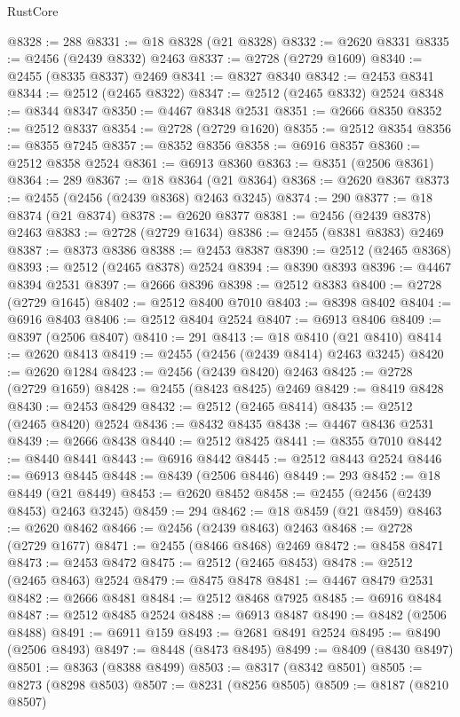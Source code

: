 \begin{lexlean}{RustCore}
\begin{coremodule}
@8328 := 288
@8331 := @18 @8328 (@21 @8328)
@8332 := @2620 @8331
@8335 := @2456 (@2439 @8332) @2463
@8337 := @2728 (@2729 @1609)
@8340 := @2455 (@8335 @8337) @2469
@8341 := @8327 @8340
@8342 := @2453 @8341
@8344 := @2512 (@2465 @8322)
@8347 := @2512 (@2465 @8332) @2524
@8348 := @8344 @8347
@8350 := @4467 @8348 @2531
@8351 := @2666 @8350
@8352 := @2512 @8337
@8354 := @2728 (@2729 @1620)
@8355 := @2512 @8354
@8356 := @8355 @7245
@8357 := @8352 @8356
@8358 := @6916 @8357
@8360 := @2512 @8358 @2524
@8361 := @6913 @8360
@8363 := @8351 (@2506 @8361)
@8364 := 289
@8367 := @18 @8364 (@21 @8364)
@8368 := @2620 @8367
@8373 := @2455 (@2456 (@2439 @8368) @2463 @3245)
@8374 := 290
@8377 := @18 @8374 (@21 @8374)
@8378 := @2620 @8377
@8381 := @2456 (@2439 @8378) @2463
@8383 := @2728 (@2729 @1634)
@8386 := @2455 (@8381 @8383) @2469
@8387 := @8373 @8386
@8388 := @2453 @8387
@8390 := @2512 (@2465 @8368)
@8393 := @2512 (@2465 @8378) @2524
@8394 := @8390 @8393
@8396 := @4467 @8394 @2531
@8397 := @2666 @8396
@8398 := @2512 @8383
@8400 := @2728 (@2729 @1645)
@8402 := @2512 @8400 @7010
@8403 := @8398 @8402
@8404 := @6916 @8403
@8406 := @2512 @8404 @2524
@8407 := @6913 @8406
@8409 := @8397 (@2506 @8407)
@8410 := 291
@8413 := @18 @8410 (@21 @8410)
@8414 := @2620 @8413
@8419 := @2455 (@2456 (@2439 @8414) @2463 @3245)
@8420 := @2620 @1284
@8423 := @2456 (@2439 @8420) @2463
@8425 := @2728 (@2729 @1659)
@8428 := @2455 (@8423 @8425) @2469
@8429 := @8419 @8428
@8430 := @2453 @8429
@8432 := @2512 (@2465 @8414)
@8435 := @2512 (@2465 @8420) @2524
@8436 := @8432 @8435
@8438 := @4467 @8436 @2531
@8439 := @2666 @8438
@8440 := @2512 @8425
@8441 := @8355 @7010
@8442 := @8440 @8441
@8443 := @6916 @8442
@8445 := @2512 @8443 @2524
@8446 := @6913 @8445
@8448 := @8439 (@2506 @8446)
@8449 := 293
@8452 := @18 @8449 (@21 @8449)
@8453 := @2620 @8452
@8458 := @2455 (@2456 (@2439 @8453) @2463 @3245)
@8459 := 294
@8462 := @18 @8459 (@21 @8459)
@8463 := @2620 @8462
@8466 := @2456 (@2439 @8463) @2463
@8468 := @2728 (@2729 @1677)
@8471 := @2455 (@8466 @8468) @2469
@8472 := @8458 @8471
@8473 := @2453 @8472
@8475 := @2512 (@2465 @8453)
@8478 := @2512 (@2465 @8463) @2524
@8479 := @8475 @8478
@8481 := @4467 @8479 @2531
@8482 := @2666 @8481
@8484 := @2512 @8468 @7925
@8485 := @6916 @8484
@8487 := @2512 @8485 @2524
@8488 := @6913 @8487
@8490 := @8482 (@2506 @8488)
@8491 := @6911 @159
@8493 := @2681 @8491 @2524
@8495 := @8490 (@2506 @8493)
@8497 := @8448 (@8473 @8495)
@8499 := @8409 (@8430 @8497)
@8501 := @8363 (@8388 @8499)
@8503 := @8317 (@8342 @8501)
@8505 := @8273 (@8298 @8503)
@8507 := @8231 (@8256 @8505)
@8509 := @8187 (@8210 @8507)

\end{coremodule}
\end{lexlean}
